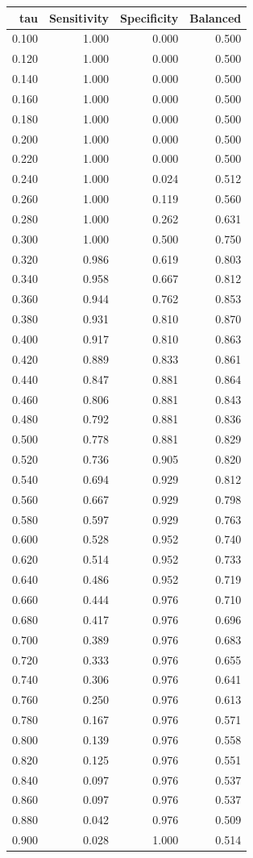 \begin{tabular}{rrrr}
\toprule
tau & Sensitivity & Specificity & Balanced \\
\midrule
0.100 & 1.000 & 0.000 & 0.500 \\
0.120 & 1.000 & 0.000 & 0.500 \\
0.140 & 1.000 & 0.000 & 0.500 \\
0.160 & 1.000 & 0.000 & 0.500 \\
0.180 & 1.000 & 0.000 & 0.500 \\
0.200 & 1.000 & 0.000 & 0.500 \\
0.220 & 1.000 & 0.000 & 0.500 \\
0.240 & 1.000 & 0.024 & 0.512 \\
0.260 & 1.000 & 0.119 & 0.560 \\
0.280 & 1.000 & 0.262 & 0.631 \\
0.300 & 1.000 & 0.500 & 0.750 \\
0.320 & 0.986 & 0.619 & 0.803 \\
0.340 & 0.958 & 0.667 & 0.812 \\
0.360 & 0.944 & 0.762 & 0.853 \\
0.380 & 0.931 & 0.810 & 0.870 \\
0.400 & 0.917 & 0.810 & 0.863 \\
0.420 & 0.889 & 0.833 & 0.861 \\
0.440 & 0.847 & 0.881 & 0.864 \\
0.460 & 0.806 & 0.881 & 0.843 \\
0.480 & 0.792 & 0.881 & 0.836 \\
0.500 & 0.778 & 0.881 & 0.829 \\
0.520 & 0.736 & 0.905 & 0.820 \\
0.540 & 0.694 & 0.929 & 0.812 \\
0.560 & 0.667 & 0.929 & 0.798 \\
0.580 & 0.597 & 0.929 & 0.763 \\
0.600 & 0.528 & 0.952 & 0.740 \\
0.620 & 0.514 & 0.952 & 0.733 \\
0.640 & 0.486 & 0.952 & 0.719 \\
0.660 & 0.444 & 0.976 & 0.710 \\
0.680 & 0.417 & 0.976 & 0.696 \\
0.700 & 0.389 & 0.976 & 0.683 \\
0.720 & 0.333 & 0.976 & 0.655 \\
0.740 & 0.306 & 0.976 & 0.641 \\
0.760 & 0.250 & 0.976 & 0.613 \\
0.780 & 0.167 & 0.976 & 0.571 \\
0.800 & 0.139 & 0.976 & 0.558 \\
0.820 & 0.125 & 0.976 & 0.551 \\
0.840 & 0.097 & 0.976 & 0.537 \\
0.860 & 0.097 & 0.976 & 0.537 \\
0.880 & 0.042 & 0.976 & 0.509 \\
0.900 & 0.028 & 1.000 & 0.514 \\
\bottomrule
\end{tabular}
